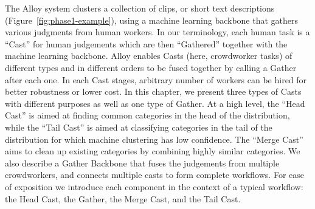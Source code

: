 


The Alloy system clusters a collection of clips, or short text descriptions (Figure~\ref{fig:phase1-example}), using a machine learning backbone that gathers various judgments from human workers. In our terminology, each human task is a ``Cast'' for human judgements which are then ``Gathered'' together with the machine learning backbone. Alloy enables Casts (here, crowdworker tasks) of different types and in different orders to be fused together by calling a Gather after each one. In each Cast stages, arbitrary number of workers can be hired for better robustness or lower cost. In this chapter, we present three types of Casts with different purposes as well as one type of Gather. At a high level, the ``Head Cast'' is aimed at finding common categories in the head of the distribution, while the ``Tail Cast'' is aimed at classifying categories in the tail of the distribution for which machine clustering has low confidence. The ``Merge Cast'' aims to clean up existing categories by combining highly similar categories. We also describe a Gather Backbone that fuses the judgements from multiple crowdworkers,
and connects multiple casts to form complete workflows. For ease of exposition we introduce each component in the context of a typical workflow: the Head Cast, the Gather, the Merge Cast, and the Tail Cast.





